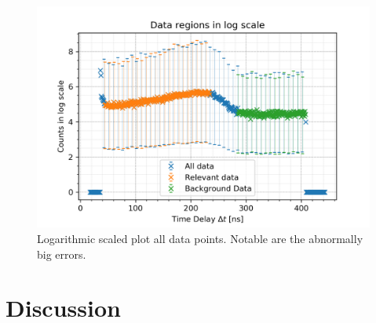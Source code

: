 \documentclass[30pt,a4paper]{article}
\begin{document}
	\begin{figure}[h]
		\includegraphics{Bilder/data_log}
		\centering
		\caption[Data with on logarithmic scale]{\small Logarithmic scaled plot all data points.
			 Notable are the abnormally big errors.}
		\label{data_log}
	\end{figure}
	
 	\FloatBarrier
 	\section{Discussion}
\end{document}
